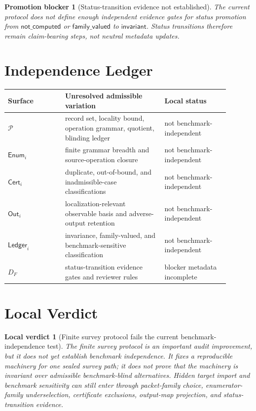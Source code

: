 \documentclass[11pt]{article}
\newcommand{\Pack}{\mathcal{P}}
\newcommand{\Enum}{\mathsf{Enum}}
\newcommand{\Cert}{\mathsf{Cert}}
\newcommand{\Out}{\mathsf{Out}}
\newcommand{\Ledger}{\mathsf{Ledger}}
\newtheorem{blocker}{Promotion blocker}
\newtheorem{verdict}{Local verdict}
\begin{document}
\begin{blocker}[Status-transition evidence not established]
The current protocol does not define enough independent evidence gates for
status promotion from \(\mathsf{not\_computed}\) or
\(\mathsf{family\_valued}\) to \(\mathsf{invariant}\). Status transitions
therefore remain claim-bearing steps, not neutral metadata updates.
\end{blocker}

\section{Independence Ledger}

\begin{center}
\begin{tabular}{p{0.23\linewidth}p{0.40\linewidth}p{0.26\linewidth}}
\textbf{Surface} & \textbf{Unresolved admissible variation} & \textbf{Local status} \\
\hline
\(\Pack\) & record set, locality bound, operation grammar, quotient, blinding ledger & not benchmark-independent \\
\(\Enum_i\) & finite grammar breadth and source-operation closure & not benchmark-independent \\
\(\Cert_i\) & duplicate, out-of-bound, and inadmissible-case classifications & not benchmark-independent \\
\(\Out_i\) & localization-relevant observable basis and adverse-output retention & not benchmark-independent \\
\(\Ledger_i\) & invariance, family-valued, and benchmark-sensitive classification & not benchmark-independent \\
\(D_F\) & status-transition evidence gates and reviewer rules & blocker metadata incomplete \\
\end{tabular}
\end{center}

\section{Local Verdict}

\begin{verdict}[Finite survey protocol fails the current benchmark-independence test]
The finite survey protocol is an important audit improvement, but it does
not yet establish benchmark independence. It fixes a reproducible machinery
for one sealed survey path; it does not prove that the machinery is invariant
over admissible benchmark-blind alternatives. Hidden target import and
benchmark sensitivity can still enter through packet-family choice,
enumerator-family underselection, certificate exclusions, output-map
projection, and status-transition evidence.
\end{verdict}
\end{document}
